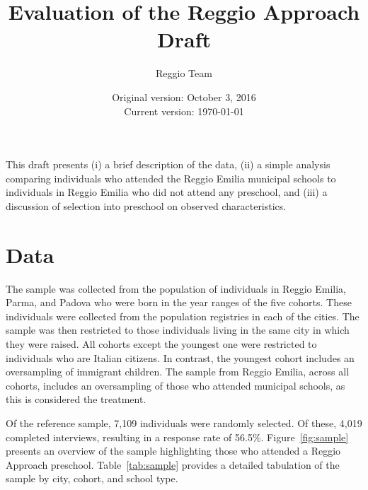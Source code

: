 


\usepackage{sectsty}
\sectionfont{\fontsize{12}{12}\selectfont}



\title{\normalsize \textbf{Evaluation of the Reggio Approach} \\ \normalsize Draft}
\author{\normalsize Reggio Team}
\date{\normalsize Original version: October 3, 2016 \\ Current version: \today}
\maketitle

\doublespacing

This draft presents (i) a brief description of the data, (ii) a simple analysis comparing individuals who attended the Reggio Emilia municipal schools to individuals in Reggio Emilia who did not attend any preschool, and (iii) a discussion of selection into preschool on observed characteristics. 

\section{Data}
\label{sec:data}

The sample was collected from the population of individuals in Reggio Emilia, Parma, and Padova who were born in the year ranges of the five cohorts.  These individuals were collected from the population registries in each of the cities. The sample was then restricted to those individuals living in the same city in which they were raised. All cohorts except the youngest one were restricted to individuals who are Italian citizens. In contrast, the youngest cohort includes an oversampling of immigrant children. The sample from Reggio Emilia, across all cohorts, includes an oversampling of those who attended municipal schools, as this is considered the treatment.

Of the reference sample, 7,109 individuals were randomly selected. Of these, 4,019 completed interviews, resulting in a response rate of 56.5\%. Figure~\ref{fig:sample} presents an overview of the sample highlighting those who attended a Reggio Approach preschool. Table~\ref{tab:sample} provides a detailed tabulation of the sample by city, cohort, and school type.

